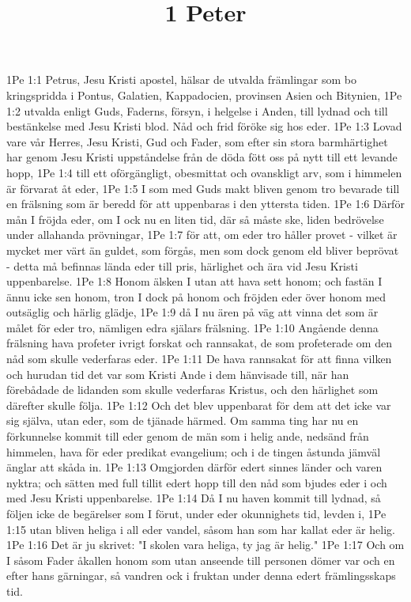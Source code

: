 

\title{1 Peter}

1Pe 1:1  Petrus, Jesu Kristi apostel, hälsar de utvalda främlingar som bo kringspridda i Pontus, Galatien, Kappadocien, provinsen Asien och Bitynien,
1Pe 1:2  utvalda enligt Guds, Faderns, försyn, i helgelse i Anden, till lydnad och till bestänkelse med Jesu Kristi blod. Nåd och frid föröke sig hos eder.
1Pe 1:3  Lovad vare vår Herres, Jesu Kristi, Gud och Fader, som efter sin stora barmhärtighet har genom Jesu Kristi uppståndelse från de döda fött oss på nytt till ett levande hopp,
1Pe 1:4  till ett oförgängligt, obesmittat och ovanskligt arv, som i himmelen är förvarat åt eder,
1Pe 1:5  I som med Guds makt bliven genom tro bevarade till en frälsning som är beredd för att uppenbaras i den yttersta tiden.
1Pe 1:6  Därför mån I fröjda eder, om I ock nu en liten tid, där så måste ske, liden bedrövelse under allahanda prövningar,
1Pe 1:7  för att, om eder tro håller provet - vilket är mycket mer värt än guldet, som förgås, men som dock genom eld bliver beprövat - detta må befinnas lända eder till pris, härlighet och ära vid Jesu Kristi uppenbarelse.
1Pe 1:8  Honom älsken I utan att hava sett honom; och fastän I ännu icke sen honom, tron I dock på honom och fröjden eder över honom med outsäglig och härlig glädje,
1Pe 1:9  då I nu ären på väg att vinna det som är målet för eder tro, nämligen edra själars frälsning.
1Pe 1:10  Angående denna frälsning hava profeter ivrigt forskat och rannsakat, de som profeterade om den nåd som skulle vederfaras eder.
1Pe 1:11  De hava rannsakat för att finna vilken och hurudan tid det var som Kristi Ande i dem hänvisade till, när han förebådade de lidanden som skulle vederfaras Kristus, och den härlighet som därefter skulle följa.
1Pe 1:12  Och det blev uppenbarat för dem att det icke var sig själva, utan eder, som de tjänade härmed. Om samma ting har nu en förkunnelse kommit till eder genom de män som i helig ande, nedsänd från himmelen, hava för eder predikat evangelium; och i de tingen åstunda jämväl änglar att skåda in.
1Pe 1:13  Omgjorden därför edert sinnes länder och varen nyktra; och sätten med full tillit edert hopp till den nåd som bjudes eder i och med Jesu Kristi uppenbarelse.
1Pe 1:14  Då I nu haven kommit till lydnad, så följen icke de begärelser som I förut, under eder okunnighets tid, levden i,
1Pe 1:15  utan bliven heliga i all eder vandel, såsom han som har kallat eder är helig.
1Pe 1:16  Det är ju skrivet: "I skolen vara heliga, ty jag är helig."
1Pe 1:17  Och om I såsom Fader åkallen honom som utan anseende till personen dömer var och en efter hans gärningar, så vandren ock i fruktan under denna edert främlingsskaps tid.
